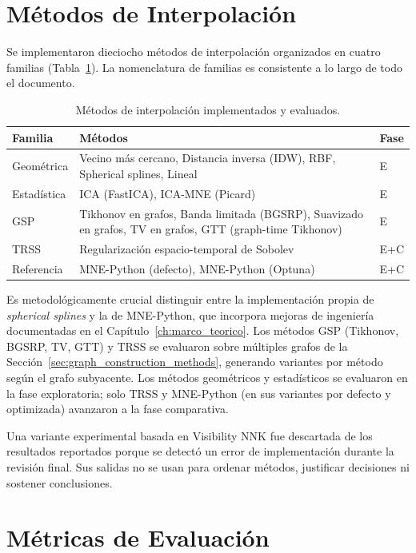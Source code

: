 \section{Métodos de Interpolación}
\label{sec:interpolation_methods}

Se implementaron dieciocho métodos de interpolación organizados en cuatro familias (Tabla~\ref{tab:methods}). La nomenclatura de familias es consistente a lo largo de todo el documento.

\begin{table}[htbp]
\centering
\caption{Métodos de interpolación implementados y evaluados.}
\label{tab:methods}
\small
\begin{tabular}{@{}lp{6.5cm}l@{}}
\toprule
Familia & Métodos & Fase \\
\midrule
Geométrica & Vecino más cercano, Distancia inversa (IDW), RBF, Spherical splines, Lineal & E \\
Estadística & ICA (FastICA), ICA-MNE (Picard) & E \\
GSP & Tikhonov en grafos, Banda limitada (BGSRP), Suavizado en grafos, TV en grafos, GTT (graph-time Tikhonov) & E \\
TRSS & Regularización espacio-temporal de Sobolev & E+C \\
Referencia & MNE-Python (defecto), MNE-Python (Optuna) & E+C \\
\bottomrule
\end{tabular}
\end{table}

Es metodológicamente crucial distinguir entre la implementación propia de \textit{spherical splines} y la de MNE-Python, que incorpora mejoras de ingeniería documentadas en el Capítulo~\ref{ch:marco_teorico}. Los métodos GSP (Tikhonov, BGSRP, TV, GTT) y TRSS se evaluaron sobre múltiples grafos de la Sección~\ref{sec:graph_construction_methods}, generando variantes por método según el grafo subyacente. Los métodos geométricos y estadísticos se evaluaron en la fase exploratoria; solo TRSS y MNE-Python (en sus variantes por defecto y optimizada) avanzaron a la fase comparativa.

Una variante experimental basada en Visibility NNK fue descartada de los resultados reportados porque se detectó un error de implementación durante la revisión final. Sus salidas no se usan para ordenar métodos, justificar decisiones ni sostener conclusiones.

\section{Métricas de Evaluación}
\label{sec:metricas}

